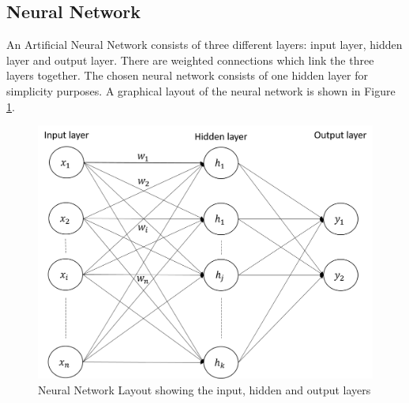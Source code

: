 \documentclass[11pt]{article}
\begin{document}
	\subsection{Neural Network}
	An Artificial Neural Network consists of three different layers: input layer, hidden layer and output layer. There are weighted connections which link the three layers together. The chosen neural network consists of one hidden layer for simplicity purposes. 
	A graphical layout of the neural network is shown in Figure \ref{fig: neural_network}.
	\begin{figure}[!h]
		\centering
		\includegraphics[scale=0.45]{neural_network.png}
		\caption{Neural Network Layout showing the input, hidden and output layers}
		\label{fig: neural_network}
	\end{figure}
	
\end{document}
